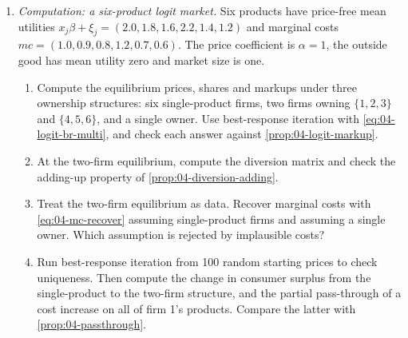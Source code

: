 \begin{enumerate}[label=\arabic*., leftmargin=*, itemsep=6pt]
\item \textit{Computation: a six-product logit market.} Six products have price-free mean utilities
$x_j\beta + \xi_j = (2.0, 1.8, 1.6, 2.2, 1.4, 1.2)$ and marginal costs $mc = (1.0, 0.9, 0.8, 1.2, 0.7, 0.6)$. The
price coefficient is $\alpha = 1$, the outside good has mean utility zero and market size is one.
\begin{enumerate}[label=(\alph*)]
  \item Compute the equilibrium prices, shares and markups under three ownership structures: six single-product
  firms, two firms owning $\{1, 2, 3\}$ and $\{4, 5, 6\}$, and a single owner. Use best-response iteration with
  \eqref{eq:04-logit-br-multi}, and check each answer against \cref{prop:04-logit-markup}.
  \item At the two-firm equilibrium, compute the diversion matrix and check the adding-up property of
  \cref{prop:04-diversion-adding}.
  \item Treat the two-firm equilibrium as data. Recover marginal costs with \eqref{eq:04-mc-recover} assuming
  single-product firms and assuming a single owner. Which assumption is rejected by implausible costs?
  \item Run best-response iteration from 100 random starting prices to check uniqueness. Then compute the change in
  consumer surplus from the single-product to the two-firm structure, and the partial pass-through of a cost
  increase on all of firm 1's products. Compare the latter with \cref{prop:04-passthrough}.
\end{enumerate}

\end{enumerate}
